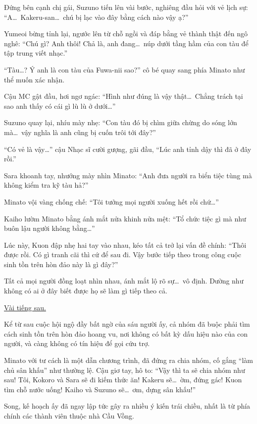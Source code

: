 \documentclass[../main.tex]{subfiles}
\begin{document}
Đứng bên cạnh chị gái, Suzuno tiến lên vài bước, nghiêng đầu hỏi với vẻ lịch sự: ``A\dots\ Kakeru-san\dots\ chú bị lạc vào đây bằng cách nào vậy ạ?''

Yumeoi bừng tỉnh lại, ngước lên từ chỗ ngồi và đáp bằng vẻ thành thật đến ngô nghê: ``Chú gì? Anh thôi! Chả là, anh đang\dots\ núp dưới tầng hầm của con tàu để tập trung viết nhạc.''

``Tàu\dots? Ý anh là con tàu của Fuwa-nii sao?'' cô bé quay sang phía Minato như thể muốn xác nhận.

Cậu MC gật đầu, hơi ngơ ngác: ``Hình như đúng là vậy thật\dots\ Chẳng trách tại sao anh thấy có cái gì lù lù ở dưới\dots''

Suzuno quay lại, nhíu mày nhẹ: ``Con tàu đó bị chìm giữa chừng do sóng lớn mà\dots\ vậy nghĩa là anh cũng bị cuốn trôi tới đây?''

``Có vẻ là vậy\dots'' cậu Nhạc sĩ cười gượng, gãi đầu, ``Lúc anh tỉnh dậy thì đã ở đây rồi.''

Sara khoanh tay, nhướng mày nhìn Minato: ``Anh đưa người ra biển tiệc tùng mà không kiểm tra kỹ tàu hả?''

Minato vội vàng chống chế: ``Tôi tưởng mọi người xuống hết rồi chứ\dots''

Kaiho lườm Minato bằng ánh mắt nửa khinh nửa mệt: ``Tổ chức tiệc gì mà như buôn lậu người không bằng\dots''

Lúc này, Kuon đập nhẹ hai tay vào nhau, kéo tất cả trở lại vấn đề chính: ``Thôi được rồi. Có gì tranh cãi thì cứ để sau đi. Vậy bước tiếp theo trong công cuộc sinh tồn trên hòn đảo này là gì đây?''

Tất cả mọi người đồng loạt nhìn nhau, ánh mắt lộ rõ sự\dots\ vô định. Dường như không có ai ở đây biết được họ sẽ làm gì tiếp theo cả.

\uline{Vài tiếng sau.}

Kể từ sau cuộc hội ngộ đầy bất ngờ của sáu người ấy, cả nhóm đã buộc phải tìm cách sinh tồn trên hòn đảo hoang vu, nơi không có bất kỳ dấu hiệu nào của con người, và càng không có tín hiệu để gọi cứu trợ.

Minato với tư cách là một dẫn chương trình, đã đứng ra chia nhóm, cố gắng ``làm chủ sân khấu'' như thường lệ. Cậu giơ tay, hô to: ``Vậy thì ta sẽ chia nhóm như sau! Tôi, Kokoro và Sara sẽ đi kiếm thức ăn! Kakeru sẽ\dots\ ờm, đứng gác! Kuon tìm chỗ nước uống! Kaiho và Suzuno sẽ\dots\ ơm, dựng sân khấu!''

Song, kế hoạch ấy đã ngay lập tức gây ra nhiều ý kiến trái chiều, nhất là từ phía chính các thành viên thuộc nhà Cầu Vồng.
\end{document}

